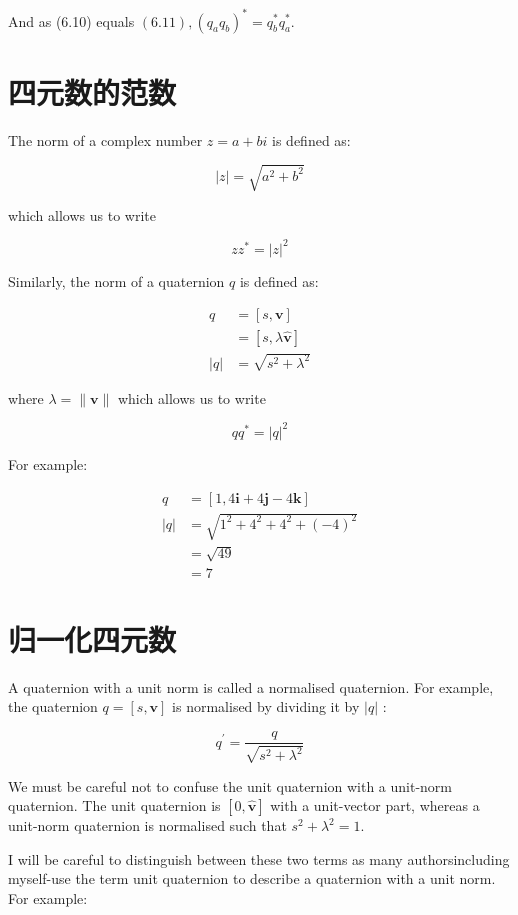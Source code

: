 And as (6.10) equals $(6.11),\left(q_{a} q_{b}\right)^{*}=q_{b}^{*} q_{a}^{*}$.

\section{四元数的范数}
The norm of a complex number $z=a+b i$ is defined as:

$$
    |z|=\sqrt{a^{2}+b^{2}}
$$

which allows us to write

$$
    z z^{*}=|z|^{2}
$$

Similarly, the norm of a quaternion $q$ is defined as:

$$
    \begin{aligned}
        q   & =[s, \mathbf{v}]               \\
            & =[s, \lambda \hat{\mathbf{v}}] \\
        |q| & =\sqrt{s^{2}+\lambda^{2}}
    \end{aligned}
$$

where $\lambda=\|\mathbf{v}\|$ which allows us to write

$$
    q q^{*}=|q|^{2}
$$

For example:

$$
    \begin{aligned}
        q   & =[1,4 \mathbf{i}+4 \mathbf{j}-4 \mathbf{k}] \\
        |q| & =\sqrt{1^{2}+4^{2}+4^{2}+(-4)^{2}}          \\
            & =\sqrt{49}                                  \\
            & =7
    \end{aligned}
$$

\section{归一化四元数}
A quaternion with a unit norm is called a normalised quaternion. For example, the quaternion $q=[s, \mathbf{v}]$ is normalised by dividing it by $|q|$ :

$$
    q^{\prime}=\frac{q}{\sqrt{s^{2}+\lambda^{2}}}
$$

We must be careful not to confuse the unit quaternion with a unit-norm quaternion. The unit quaternion is $[0, \hat{\mathbf{v}}]$ with a unit-vector part, whereas a unit-norm quaternion is normalised such that $s^{2}+\lambda^{2}=1$.

I will be careful to distinguish between these two terms as many authorsincluding myself-use the term unit quaternion to describe a quaternion with a unit norm. For example:

